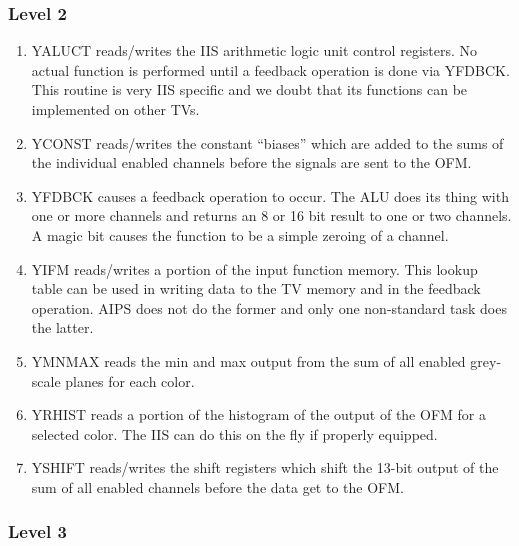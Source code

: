 \subsubsection{Level 2}

\begin{enumerate} %
\item YALUCT reads/writes the IIS arithmetic logic unit
control registers.
No actual function is performed until a feedback operation is done via
YFDBCK.  This routine is very IIS specific and we doubt that its
functions can be implemented on other TVs.
\item YCONST reads/writes the constant ``biases'' which are
added to the sums of the individual enabled channels before the signals
are sent to the OFM.
\item YFDBCK causes a feedback operation to occur.  The ALU
does its thing
with one or more channels and returns an 8 or 16 bit result to one or
two channels.  A magic bit causes the function to be a simple zeroing
of a channel.
\item YIFM reads/writes a portion of the input function memory.
This lookup
table can be used in writing data to the TV memory and in the feedback
operation.  AIPS does not do the former and only one non-standard task
does the latter.
\item YMNMAX reads the min and max output from the sum of
all enabled grey-scale planes for each color.
\item YRHIST reads a portion of the histogram of the output
of the OFM for a selected color.  The IIS can do this on the fly if properly
equipped.
\item YSHIFT reads/writes the shift registers which shift the
13-bit output of the sum of all enabled channels before the data get to
the OFM.

\end{enumerate} %
\subsubsection{Level 3}

